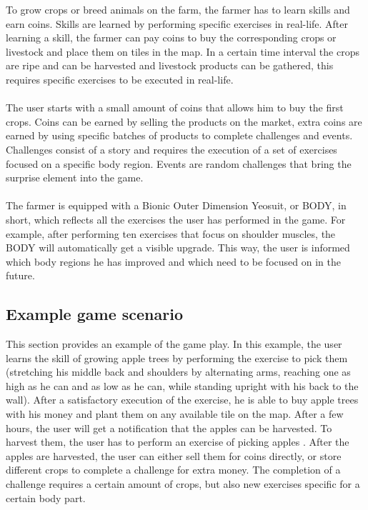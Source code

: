 \documentclass[a4paper,11pt,notitlepage]{report}
\begin{document}
To grow crops or breed animals on the farm, the farmer has to learn skills and earn coins. Skills are learned by performing specific exercises in real-life. After learning a skill, the farmer can pay coins to buy the corresponding crops or livestock and place them on tiles in the map. In a certain time interval the crops are ripe and can be harvested and livestock products can be gathered, this requires specific exercises to be executed in real-life. 
\\\\
The user starts with a small amount of coins that allows him to buy the first crops. Coins can be earned by selling the products on the market, extra coins are earned by using specific batches of products to complete challenges and events. Challenges consist of a story and requires the execution of a set of exercises focused on a specific body region. Events are random challenges that bring the surprise element into the game.
\\\\
The farmer is equipped with a Bionic Outer Dimension Yeosuit, or BODY, in short, which reflects all the exercises the user has performed in the game. For example, after performing ten exercises that focus on shoulder muscles, the BODY will automatically get a visible upgrade. This way, the user is informed which body regions he has improved and which need to be focused on in the future.

\subsection{Example game scenario}
This section provides an example of the game play. In this example, the user learns the skill of growing apple trees by performing the exercise to pick them (stretching his middle back and shoulders by alternating arms, reaching one as high as he can and as low as he can, while standing upright with his back to the wall). After a satisfactory execution of the exercise, he is able to buy apple trees with his money and plant them on any available tile on the map. After a few hours, the user will get a notification that the apples can be harvested. To harvest them, the user has to perform an exercise of picking apples . After the apples are harvested, the user can either sell them for coins directly, or store different crops to complete a challenge for extra money. The completion of a challenge requires a certain amount of crops, but also new exercises specific for a certain body part. 
\end{document}
